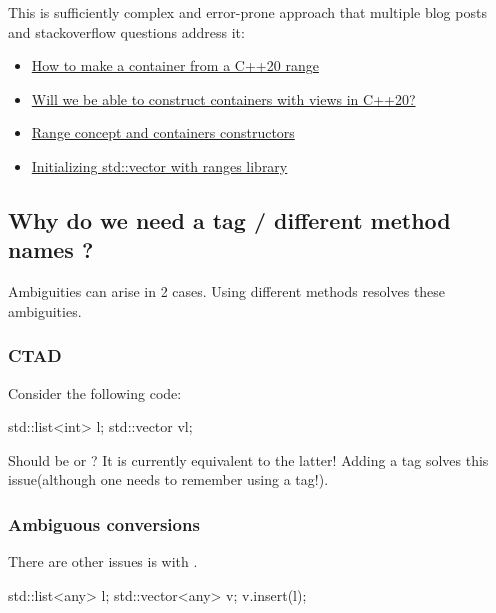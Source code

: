 \documentclass{wg21}
\begin{document}
This is sufficiently complex and error-prone approach that multiple blog posts and stackoverflow questions address it:

\begin{itemize}
\item \href{https://timur.audio/how-to-make-a-container-from-a-c20-range}{How to make a container from a C++20 range}
\item \href{https://stackoverflow.com/questions/59452296/will-we-be-able-to-construct-containers-with-views-in-c20}{Will we be able to construct containers with views in C++20?}
\item \href{https://stackoverflow.com/questions/62043660/range-concept-and-containers-constructors}{Range concept and containers constructors}
\item \href{https://stackoverflow.com/questions/62043660/range-concept-and-containers-constructors}{Initializing std::vector with ranges library}
\end{itemize}

\subsection{Why do we need a tag / different method names ?}

Ambiguities can arise in 2 cases. Using different methods resolves these ambiguities.

\subsubsection{CTAD}

Consider the following code:

\begin{colorblock}
std::list<int> l;
std::vector v{l};
\end{colorblock}

Should  be  or  ?
It is currently equivalent to the latter!
Adding a tag solves this issue(although one needs to remember using a tag!).

\subsubsection{Ambiguous conversions}

There are other issues is with .

\begin{colorblock}
std::list<any> l;
std::vector<any> v;
v.insert(l);
\end{colorblock}
\end{document}
